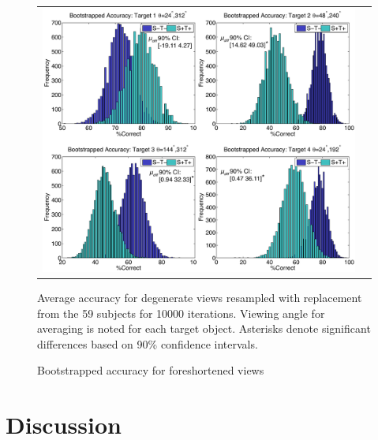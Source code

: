 \documentclass[dwyatte_dissertation.tex]{subfiles}
\begin{document}
\begin{figure}[h!]
\begin{center}
\begin{tabular}{ll}
\includegraphics[width=160mm]{figs/chap_bpleast/results_bootstrap_montage.pdf}
\end{tabular}
\end{center}
\caption{Bootstrapped accuracy for foreshortened views}{Average accuracy for degenerate views resampled with replacement from the 59 subjects for 10000 iterations. Viewing angle for averaging is noted for each target object. Asterisks denote significant differences based on 90\% confidence intervals.}
\label{fig:bpleast_behave_bootstrap}
\end{figure}

\section{Discussion}



\end{document}
